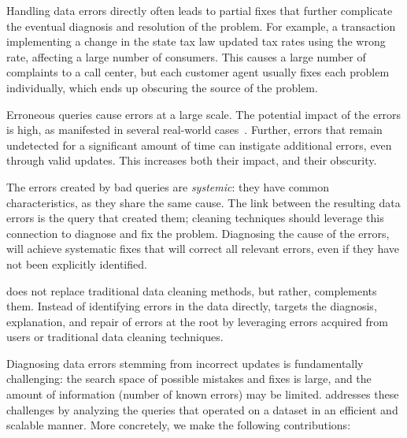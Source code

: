 \begin{description}[leftmargin=*, topsep=0mm, itemsep=0mm]
    
    \item[Obscurity.] 
    Handling data errors directly often
    leads to partial fixes that further complicate the eventual diagnosis and
    resolution of the problem. For example, a transaction implementing a
    change in the state tax law updated tax rates using the wrong rate,
    affecting a large number of consumers. This causes a large number of
    complaints to a call center, but each customer agent usually fixes each
    problem individually, which ends up obscuring the source of the problem.
    
    \item[Large impact.] Erroneous queries cause errors at a large scale. The
    potential impact of the errors is high, as manifested in several
    real-world cases~\cite{Yates10, Grady13, sakalerrors}. Further, errors
    that remain undetected for a significant amount of time can instigate
    additional errors, even through valid updates. This increases both their
    impact, and their obscurity.
    
    \item[Systemic errors.] The errors created by bad queries are
    \emph{systemic}: they have common characteristics, as they share the same
    cause. The link between the resulting data errors is the query that
    created them; cleaning techniques should leverage this connection to
    diagnose and fix the problem. Diagnosing the cause of the errors, will
    achieve systematic fixes that will correct all relevant errors, even if
    they have not been explicitly identified.
    
\end{description}
% 
\sys does not replace traditional data cleaning methods, but rather, complements them.
Instead of identifying errors in the data directly, 
\sys targets the diagnosis, explanation, and repair of errors at the root by
leveraging errors acquired from 
users or traditional data cleaning techniques.

Diagnosing data errors stemming from incorrect updates is fundamentally
challenging: the search space of possible mistakes and fixes is large, and the
amount of information (number of known errors) may be limited. 
\sys addresses these challenges by analyzing the queries that operated on a
dataset in an efficient and scalable manner. More concretely, we make the
following contributions:


